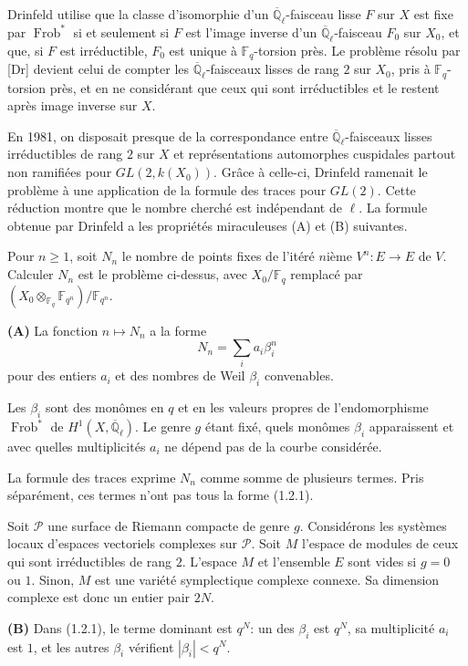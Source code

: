 \documentclass[11pt,a4paper]{article}
\theoremstyle{plain}
\theoremstyle{definition}
\DeclareMathOperator{\Frob}{Frob}
\newcommand{\F}{\mathbb{F}}
\newcommand{\Ql}{\overline{\mathbb{Q}}_\ell}
\begin{document}
Drinfeld utilise que la classe d'isomorphie d'un $\Ql$-faisceau lisse $F$ sur $X$ est fixe par $\Frob^*$ si et seulement si $F$ est l'image inverse d'un $\Ql$-faisceau $F_0$ sur $X_0$, et que, si $F$ est irr\'eductible, $F_0$ est unique \`a $\F_q$-torsion pr\`es. Le probl\`eme r\'esolu par [Dr] devient celui de compter les $\Ql$-faisceaux lisses de rang $2$ sur $X_0$, pris \`a $\F_q$-torsion pr\`es, et en ne consid\'erant que ceux qui sont irr\'eductibles et le restent apr\`es image inverse sur $X$.

En 1981, on disposait presque de la correspondance entre $\Ql$-faisceaux lisses irr\'eductibles de rang $2$ sur $X$ et repr\'esentations automorphes cuspidales partout non ramifi\'ees pour $GL(2,k(X_0))$. Gr\^ace \`a celle-ci, Drinfeld ramenait le probl\`eme \`a une application de la formule des traces pour $GL(2)$. Cette r\'eduction montre que le nombre cherch\'e est ind\'ependant de $\ell$. La formule obtenue par Drinfeld a les propri\'et\'es miraculeuses (A) et (B) suivantes.

Pour $n \geq 1$, soit $N_n$ le nombre de points fixes de l'it\'er\'e $n$i\`eme $V^n: E \to E$ de $V$. Calculer $N_n$ est le probl\`eme ci-dessus, avec $X_0/\F_q$ remplac\'e par $(X_0 \otimes_{\F_q} \F_{q^n})/\F_{q^n}$.

\medskip
\noindent\textbf{(A)} La fonction $n \mapsto N_n$ a la forme
\begin{equation}
N_n = \sum_i a_i \beta_i^n
\tag{1.2.1}
\end{equation}
pour des entiers $a_i$ et des nombres de Weil $\beta_i$ convenables.

Les $\beta_i$ sont des mon\^omes en $q$ et en les valeurs propres de l'endomorphisme $\Frob^*$ de $H^1(X, \Ql)$. Le genre $g$ \'etant fix\'e, quels mon\^omes $\beta_i$ apparaissent et avec quelles multiplicit\'es $a_i$ ne d\'epend pas de la courbe consid\'er\'ee.

La formule des traces exprime $N_n$ comme somme de plusieurs termes. Pris s\'epar\'ement, ces termes n'ont pas tous la forme (1.2.1).

Soit $\mathcal{P}$ une surface de Riemann compacte de genre $g$. Consid\'erons les syst\`emes locaux d'espaces vectoriels complexes sur $\mathcal{P}$. Soit $M$ l'espace de modules de ceux qui sont irr\'eductibles de rang $2$. L'espace $M$ et l'ensemble $E$ sont vides si $g = 0$ ou $1$. Sinon, $M$ est une vari\'et\'e symplectique complexe connexe. Sa dimension complexe est donc un entier pair $2N$.

\medskip
\noindent\textbf{(B)} Dans (1.2.1), le terme dominant est $q^N$: un des $\beta_i$ est $q^N$, sa multiplicit\'e $a_i$ est $1$, et les autres $\beta_i$ v\'erifient $|\beta_i| < q^N$.
\end{document}
